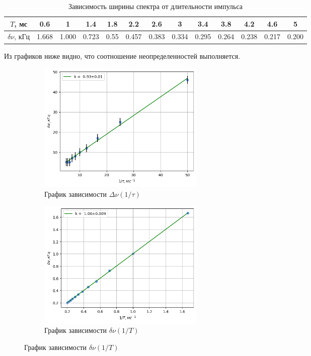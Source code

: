 \begin{table}[h!]
    \centering
    \begin{tabular}{|c|c|c|c|c|c|c|c|c|c|c|c|c|}
        \hline
        $T$, мс & 0.6& 1& 1.4& 1.8& 2.2& 2.6& 3& 3.4& 3.8& 4.2& 4.6& 5 \\\hline
        $\delta\nu$, кГц &1.668& 1.000& 0.723& 0.55& 0.457& 0.383& 0.334& 0.295& 0.264& 0.238& 0.217& 0.200\\\hline
    \end{tabular}
    \caption{Зависимость ширины спектра от длительности импульса}
\end{table}
\indent Из графиков ниже видно, что соотношение неопределенностей выполняется.
\newpage
\begin{figure}[h!]
    \centering
    \begin{subfigure}[b]{0.48\linewidth}
        \includegraphics[width=8cm]{plot1.png}
        \caption{График зависимости $\Delta\nu(1 / \tau)$}
    \end{subfigure}
    \hfill
    \begin{subfigure}[b]{0.48\linewidth}
        \includegraphics[width=8cm]{plot2.png}
        \caption{График зависимости $\delta\nu(1 /T)$}
    \end{subfigure}
\end{figure}



